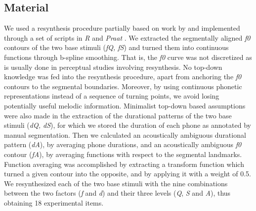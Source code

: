 \subsection{Material}\label{sec522}
We used a resynthesis procedure partially based on work by \citet{gubian2010automatic,gubian2011joint} and implemented through a set of scripts in \textit{R} \citep{r2008r} and \textit{Praat} \citep{boersma2008praat}. We extracted the segmentally aligned \textit{f0} contours of the two base stimuli (\textit{fQ, fS}) and turned them into continuous functions through b-spline smoothing. That is, the \textit{f0} curve was not discretized as is usually done in perceptual studies involving resynthesis. No top-down knowledge was fed into the resynthesis procedure, apart from anchoring the \textit{f0} contours to the segmental boundaries. Moreover, by using continuous phonetic representations instead of a sequence of turning points, we avoid losing potentially useful melodic information. Minimalist top-down based assumptions were also made in the extraction of the durational patterns of the two base stimuli (\textit{dQ, dS}), for which we stored the duration of each phone as annotated by manual segmentation.
Then we calculated an acoustically ambiguous durational pattern (\textit{dA}), by averaging phone durations, and an acoustically ambiguous \textit{f0} contour (\textit{fA}), by averaging functions with respect to the segmental landmarks. Function averaging was accomplished by extracting a transform function which turned a given contour into the opposite, and by applying it with a weight of 0.5. We resynthesized each of the two base stimuli with the nine combinations between the two factors (\textit{f} and \textit{d}) and their three levels (\textit{Q}, \textit{S} and \textit{A}), thus obtaining 18 experimental items.
